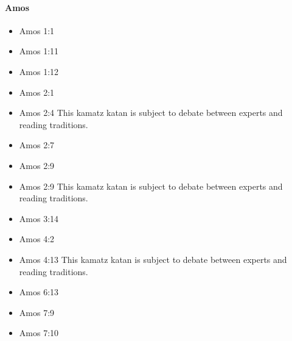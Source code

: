 \documentclass[14pt]{article}
\begin{document}
															\paragraph{Amos}
														\begin{multicols}{2}\begin{itemize}
																
																\item Amos 1:1
																
																\item Amos 1:11
																
																\item Amos 1:12
																
																\item Amos 2:1
																
																\item Amos 2:4 This kamatz katan is subject to debate between experts and reading traditions.
																
																\item Amos 2:7
																
																\item Amos 2:9
																
																\item Amos 2:9 This kamatz katan is subject to debate between experts and reading traditions.
																
																\item Amos 3:14
																
																\item Amos 4:2
																
																\item Amos 4:13 This kamatz katan is subject to debate between experts and reading traditions.
																
																\item Amos 6:13
																
																\item Amos 7:9
																
																\item Amos 7:10
																

\end{itemize}
\end{multicols}
\end{document}
